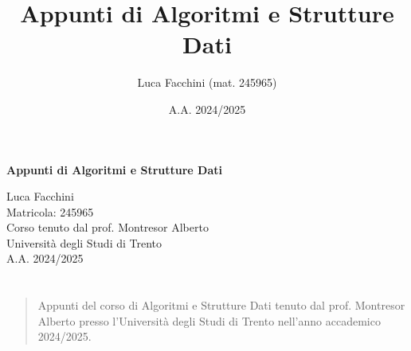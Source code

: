 \documentclass[twoside]{report}
\title{Appunti di Algoritmi e Strutture Dati}
\author{Luca Facchini (mat. 245965)}
\date{A.A. 2024/2025}
\makeatletter
\renewenvironment{abstract}{%
    \if@twocolumn
        \section*{\abstractname}%
    \else
        \begin{center}%
            {\bfseries \abstractname\vspace{-.5em}\vspace{\z@}}%
        \end{center}%
        \small
        \begin{quotation}
    \fi}
    {\if@twocolumn\else\end{quotation}\fi}
\theoremstyle{definition}
\makeatother
\begin{document}
    \begin{titlepage}
        \centering  %
        {\Huge\textbf{Appunti di Algoritmi e Strutture Dati}} \\[1cm] %
        \vspace{0.5cm}
        
        {\Large Luca Facchini} \\ %
        \vspace{0.3cm}
        {\large Matricola: 245965} \\[2cm] %
        
        {\large Corso tenuto dal prof. Montresor Alberto} \\[0.3cm] %
        {\large Università degli Studi di Trento} \\[1.5cm]
        
        {\large A.A. 2024/2025} \\[3cm] %
        
        \vfill
        \begin{abstract}
            Appunti del corso di Algoritmi e Strutture Dati tenuto dal prof. Montresor Alberto presso l'Università degli Studi di Trento nell'anno accademico 2024/2025.
        \end{abstract}
        
        \vfill  %
    \end{titlepage}
    \pagestyle{stdPage}
    \renewcommand{\headheight}{14.5pt}
    \begingroup
        \tableofcontents
        \thispagestyle{stdPage}
    \endgroup
    
    
    
    
    
\end{document}
